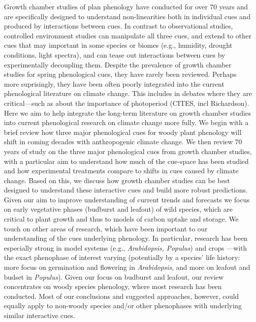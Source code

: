 \documentclass[11pt,letter]{article}
\begin{document}
Growth chamber studies of plan phenology have conducted for over 70 years and are specifically designed to understand non-linearities both in individual cues and produced by interactions between cues. In contrast to observational studies, controlled environment studies can manipulate all three cues, and extend to other cues that may important in some species or biomes (e.g., humidity, drought conditions, light spectra), and can tease out interactions between cues by experimentally decoupling them. Despite the prevalence of growth chamber studies for spring phenological cues, they have rarely been reviewed. Perhaps more suprisingly, they have been often poorly integrated into the current phenological literature on climate change. This includes in debates where they are critical---such as about the importance of photoperiod (CITES, incl Richardson).\\

Here we aim to help integrate the long-term literature on growth chamber studies into current phenological research on climate change more fully. We begin with a brief review how three major phenological cues for woody plant phenology will shift in coming decades with anthropogenic climate change. We then review 70 years of study on the three major phenological cues from growth chamber studies, with a particular aim to understand how much of the cue-space has been studied and how experimental treatments compare to shifts in cues caused by climate change. Based on this, we discuss how growth chamber studies can be best designed to understand these interactive cues and build more robust predictions.\\

Given our aim to improve understanding of current trends and forecasts we focus on early vegetative phases (budburst and leafout) of wild species, which are critical to plant growth and thus to models of carbon uptake and storage. We touch on other areas of research, which have been important to our understanding of the cues underlying phenology. In particular, research has been especially strong in model systems (e.g., \emph{Arabidopsis, Populus}) and crops \citep{cesaraccio2004}---with the exact phenophase of interest varying (potentially by a species' life history: more focus on germination and flowering in \emph{Arabidopsis}, and more on leafout and budset in \emph{Populus}).  Given our focus on budburst and leafout, our review concentrates on woody species phenology, where most research has been conducted. Most of our conclusions and suggested approaches, however, could equally apply to non-woody species and/or other phenophases with underlying similar interactive cues.\\ 
\end{document}
